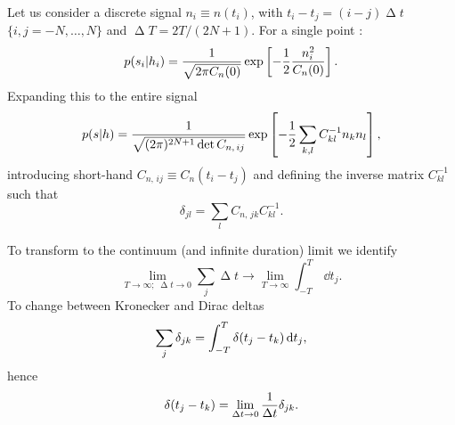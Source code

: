 Let us consider a discrete signal $n_i \equiv n(t_i)$, with $t_i - t_j = (i - j)\upDelta t$ $\{i,j = -N, \ldots, N\}$ and $\upDelta T = 2T/(2N + 1)$. For a single point \citep{Finn1992}:
\begin{equation}
p(s_i|h_i) = \frac{1}{\sqrt{2\pi C_n(0)}} \exp\left[-\frac{1}{2} \frac{n_i^2}{C_n(0)}\right].
\end{equation}
Expanding this to the entire signal
\begin{equation}
p(s|h) = \frac{1}{\sqrt{(2\pi)^{2N+1} \det C_{n,\,ij}}} \exp\left[-\frac{1}{2} \sum_{k,l}C^{-1}_{kl}n_k n_l\right],
\label{eq:prod_prob}
\end{equation}
introducing short-hand $C_{n,\,ij} \equiv C_n(t_i - t_j)$ and defining the inverse matrix $C^{-1}_{kl}$ such that
\begin{equation}
\delta_{jl} = \sum_l C_{n,\,jk}C^{-1}_{kl}.
\end{equation}

To transform to the continuum (and infinite duration) limit we identify
\begin{equation}
\lim_{T \rightarrow \infty; \; \upDelta t \rightarrow 0} \sum_j \upDelta t \rightarrow \lim_{T \rightarrow \infty} \int_{-T}^{T}\,\dd t_j.
\end{equation}
To change between Kronecker and Dirac deltas
\begin{equation}
\sum_j \delta_{jk} = \int_{-T}^{T}{\delta(t_j - t_k)}\,\mathrm{d}{t_j},
\end{equation}
hence
\begin{equation}
\delta(t_j - t_k) = \lim_{\Delta t \rightarrow 0} \frac{1}{\Delta t} \delta_{jk}.
\end{equation}

